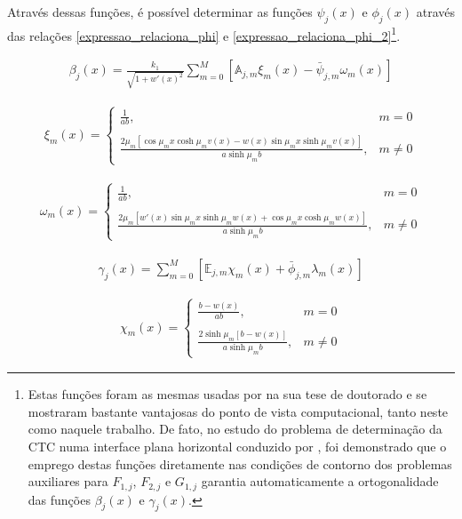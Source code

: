 Através dessas funções, é possível determinar as funções $\psi_j(x)$ e $\phi_j(x)$ através das relações \eqref{expressao_relaciona_phi} e \eqref{expressao_relaciona_phi_2}\footnote{Estas funções foram as mesmas usadas por \cite{tese_padilha} na sua tese de doutorado e se mostraram bastante vantajosas do ponto de vista computacional, tanto neste como naquele trabalho. De fato, no estudo do problema de determinação da CTC numa interface plana horizontal conduzido por \cite{tese_padilha}, foi demonstrado que o emprego destas funções diretamente nas condições de contorno dos problemas auxiliares para $F_{1,j}$, $F_{2,j}$ e $G_{1,j}$ garantia automaticamente a ortogonalidade das funções $\beta_j(x)$ e $\gamma_j(x)$.}.


\newpage
\begin{align}
\beta_j(x) = \frac{k_1}{\sqrt{1 + w'(x)^2}}\sum_{m=0}^M [\mathbb{A}_{j,m}\xi_m(x) - \bar{\psi}_{j, m}\omega_m(x)]
\end{align}

\begin{align}
\xi_m(x) = \left\lbrace
\begin{array}{ll}
\displaystyle \frac{1}{ab}, & m = 0 \\ \nonumber \\
\displaystyle \frac{2\mu_m[\cos\mu_m x\cosh\mu_m v(x) - w(x)\sin\mu_m x\sinh\mu_m v(x)]}{a\sinh\mu_m b}, & m \ne 0
\end{array}
\right.
\end{align}

\begin{align}
\omega_m(x) = \left\lbrace
\begin{array}{ll}
\displaystyle \frac{1}{ab}, & m = 0 \\ \nonumber \\
\displaystyle \frac{2\mu_m[w'(x)\sin\mu_m x\sinh\mu_m w(x) + \cos\mu_m x\cosh\mu_m w(x)]}{a\sinh\mu_m b}, & m \ne 0
\end{array}
\right.
\end{align}

\begin{align}
\gamma_j(x) = \sum_{m=0}^M [\mathbb{E}_{j,m}\chi_m(x) + \bar{\phi}_{j, m}\lambda_m(x)]
\end{align} 

\begin{align}
\chi_m(x) = \left\lbrace
\begin{array}{ll}
\displaystyle \frac{b - w(x)}{ab}, & m = 0 \\ \nonumber \\
\displaystyle \frac{2\sinh\mu_m [b - w(x)]}{a\sinh\mu_m b}, & m \ne 0
\end{array}
\right.
\end{align}

